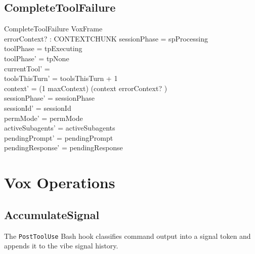 \documentclass[a4paper,10pt,fleqn]{article}
\begin{document}
\subsection{CompleteToolFailure}

\begin{schema}{CompleteToolFailure}
  VoxFrame \\
  errorContext? : CONTEXTCHUNK
  \where
  sessionPhase = spProcessing \\
  toolPhase = tpExecuting \\
  toolPhase' = tpNone \\
  currentTool' = \emptyset \\
  toolsThisTurn' = toolsThisTurn + 1 \\
  context' = (1 \upto maxContext) \dres (context \cat \langle errorContext? \rangle) \\
  sessionPhase' = sessionPhase \\
  sessionId' = sessionId \\
  permMode' = permMode \\
  activeSubagents' = activeSubagents \\
  pendingPrompt' = pendingPrompt \\
  pendingResponse' = pendingResponse
\end{schema}

\section{Vox Operations}

\subsection{AccumulateSignal}

The \texttt{PostToolUse} Bash hook classifies command output into a
signal token and appends it to the vibe signal history.
\end{document}
